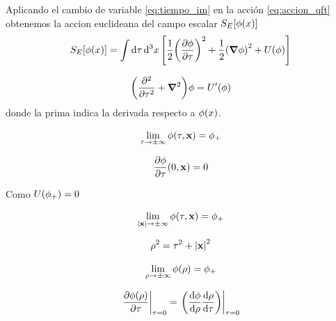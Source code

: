 Aplicando el cambio de variable \eqref{eq:tiempo_im} en la acción \eqref{eq:accion_qft} obtenemos la accion euclideana del campo escalar $S_E\qty[\phi\qty(x)]$
\begin{equation}
S_E\qty[\phi\qty(x)] = \int \dd{\tau} \dd[3]{x} \qty[\frac{1}{2}\qty(\pdv{\phi}{\tau})^2 + \frac{1}{2}\qty(\grad{\phi})^2 + U\qty(\phi)] 
\end{equation}

\begin{equation}
\qty(\pdv[2]{\tau} + \grad{}^2)\phi = U'\qty(\phi)
\end{equation}
donde la prima indica la derivada respecto a $\phi\qty(x)$.

\begin{equation}
\lim_{\tau \rightarrow \pm\infty} \phi\qty(\tau, \vb{x}) = \phi_+
\end{equation}

\begin{equation}
\pdv{\phi}{\tau}\qty(0, \vb{x}) = 0
\end{equation}


Como $U\qty(\phi_+) = 0$


\begin{equation}
\lim_{\qty|\vb{x}| \rightarrow \pm\infty} \phi\qty(\tau, \vb{x}) = \phi_+
\end{equation}


\begin{equation}
	\rho^2 = \tau^2 + \qty|\vb{x}|^2
\end{equation}

\begin{equation}
\lim_{\rho \rightarrow \pm\infty} \phi\qty(\rho) = \phi_+
\end{equation}

\begin{equation}
\eval{\pdv{\phi\qty(\rho)}{\tau}}_{\tau = 0} = \eval{\qty(\dv{\phi}{\rho}\dv{\rho}{\tau})}_{\tau = 0}
\end{equation}

